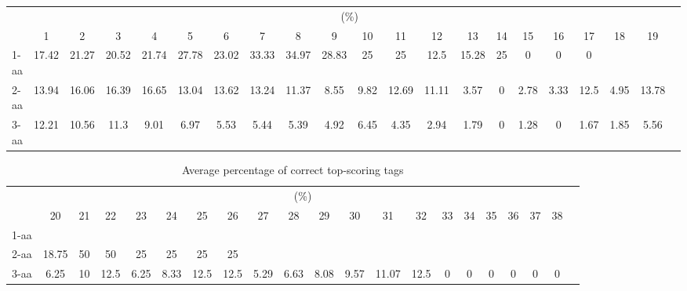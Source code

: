 \documentclass{article}
\begin{document}
\begin{table}[h]\tiny
\vspace{3mm}
{\centering
\begin{center}
\begin{tabular}{|l|c|c|c|c|c|c|c|c|c|c|c|c|c|c|c|c|c|c|c|c|}
  \hline
  & \multicolumn{ 19 }{|c|}{(\%)} \\
  \cline{2- 20}
    & 1 & 2 & 3 & 4 & 5 & 6 & 7 & 8 & 9 & 10 & 11 & 12 & 13 & 14 & 15 & 16 & 17 & 18 & 19\\
  \hline
1-aa  & 17.42 & 21.27 & 20.52 & 21.74 & 27.78 & 23.02 & 33.33 & 34.97 & 28.83 & 25 & 25 & 12.5 & 15.28 & 25 & 0 & 0 & 0 &  & \\
2-aa  & 13.94 & 16.06 & 16.39 & 16.65 & 13.04 & 13.62 & 13.24 & 11.37 & 8.55 & 9.82 & 12.69 & 11.11 & 3.57 & 0 & 2.78 & 3.33 & 12.5 & 4.95 & 13.78\\
3-aa  & 12.21 & 10.56 & 11.3 & 9.01 & 6.97 & 5.53 & 5.44 & 5.39 & 4.92 & 6.45 & 4.35 & 2.94 & 1.79 & 0 & 1.28 & 0 & 1.67 & 1.85 & 5.56\\
 \hline
\end{tabular}
\end{center}
\par}
\centering

\vspace{3mm}
\label{table:k}
\end{table}
\begin{table}[h]\tiny
\vspace{3mm}
{\centering
\begin{center}
\begin{tabular}{|l|c|c|c|c|c|c|c|c|c|c|c|c|c|c|c|c|c|c|c|c|}
  \hline
  & \multicolumn{ 19 }{|c|}{(\%)} \\
  \cline{2- 20}
    & 20 & 21 & 22 & 23 & 24 & 25 & 26 & 27 & 28 & 29 & 30 & 31 & 32 & 33 & 34 & 35 & 36 & 37 & 38\\
  \hline
1-aa  &  &  &  &  &  &  &  &  &  &  &  &  &  &  &  &  &  &  & \\
2-aa  & 18.75 & 50 & 50 & 25 & 25 & 25 & 25 &  &  &  &  &  &  &  &  &  &  &  & \\
3-aa  & 6.25 & 10 & 12.5 & 6.25 & 8.33 & 12.5 & 12.5 & 5.29 & 6.63 & 8.08 & 9.57 & 11.07 & 12.5 & 0 & 0 & 0 & 0 & 0 & 0\\
 \hline
\end{tabular}
\end{center}
\par}
\centering

\caption{ Average percentage of correct top-scoring tags}

\vspace{3mm}
\label{table:k}
\end{table}
\end{document}
